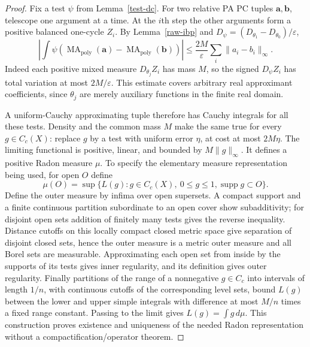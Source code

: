 \documentclass[11pt]{article}
\newcommand{\MA}{\operatorname{MA}_{\mathrm{poly}}}
\begin{document}
\begin{proof}
Fix a test $\psi$ from Lemma~\ref{test-dc}. For two relative PA PC tuples
$\mathbf a,\mathbf b$, telescope one argument at a time. At the $i$th
step the other arguments form a positive balanced one-cycle $Z_i$.
By Lemma~\ref{raw-ibp} and $D_\psi=(D_{\theta_1}-D_{\theta_0})/\varepsilon$,
\begin{equation}\label{test-estimate}
 \left|\int\psi(\MA(\mathbf a)-\MA(\mathbf b))\right|
 \leq \frac{2M}{\varepsilon}\sum_i\|a_i-b_i\|_\infty.
\end{equation}
Indeed each positive mixed measure $D_{\theta_j}Z_i$ has mass $M$,
so the signed $D_\psi Z_i$ has total variation at most $2M/\varepsilon$.
This estimate covers arbitrary real approximant coefficients, since
$\theta_j$ are merely auxiliary functions in the finite real domain.

A uniform-Cauchy approximating tuple therefore has Cauchy integrals for
all these tests. Density and the common mass $M$ make the same true
for every $g\in C_c(X)$: replace $g$ by a test with uniform error
$\eta$, at cost at most $2M\eta$. The limiting functional is positive,
linear, and bounded by $M\|g\|_\infty$. It defines a positive Radon
measure $\mu$. To specify the elementary measure representation being
used, for open $O$ define
\[
 \mu(O)=\sup\{L(g):g\in C_c(X),\ 0\leq g\leq1,
                         \operatorname{supp}g\subset O\}.
\]
Define the outer measure by infima over open supersets. A compact
support and a finite continuous partition subordinate to an open
cover show subadditivity; for disjoint open sets addition of finitely
many tests gives the reverse inequality. Distance cutoffs on this
locally compact closed metric space give separation of disjoint closed
sets, hence the outer measure is a metric outer measure and all Borel
sets are measurable. Approximating each open set from inside by the
supports of its tests gives inner regularity, and its definition gives
outer regularity. Finally partitions of the range of a nonnegative
$g\in C_c$ into intervals of length $1/n$, with continuous cutoffs of
the corresponding level sets, bound $L(g)$ between the lower and upper
simple integrals with difference at most $M/n$ times a fixed range
constant. Passing to the limit gives $L(g)=\int g\,d\mu$.
This construction proves existence and uniqueness of the needed Radon
representation without a compactification/operator theorem.


\end{proof}
\end{document}
